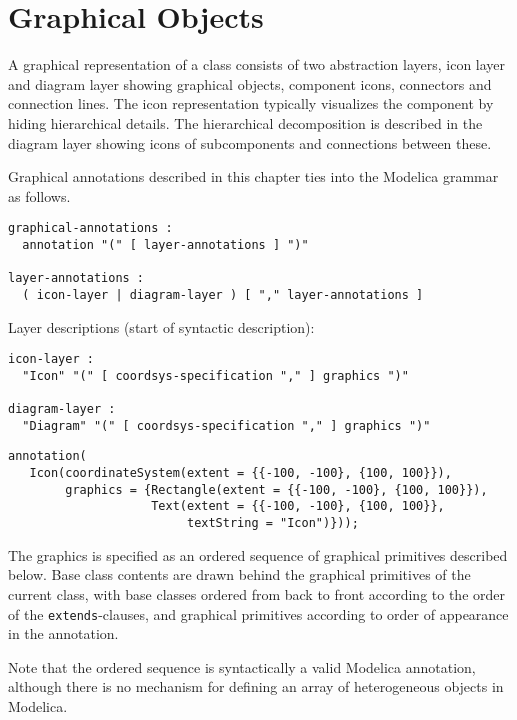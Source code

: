 \section{Graphical Objects}\label{annotations-for-graphical-objects}\label{graphical-objects}

A graphical representation of a class consists of two abstraction layers, icon layer and diagram layer showing graphical objects, component icons, connectors and connection lines.
The icon representation typically visualizes the component by hiding hierarchical details.
The hierarchical decomposition is described in the diagram layer showing icons of subcomponents and connections between these.

Graphical annotations described in this chapter ties into the Modelica grammar as follows.
\begin{lstlisting}[language=grammar]
graphical-annotations :
  annotation "(" [ layer-annotations ] ")"

layer-annotations :
  ( icon-layer | diagram-layer ) [ "," layer-annotations ]
\end{lstlisting}
Layer descriptions (start of syntactic description):
\begin{lstlisting}[language=grammar]
icon-layer :
  "Icon" "(" [ coordsys-specification "," ] graphics ")"

diagram-layer :
  "Diagram" "(" [ coordsys-specification "," ] graphics ")"
\end{lstlisting}%

\begin{example}
\begin{lstlisting}[language=modelica]
annotation(
   Icon(coordinateSystem(extent = {{-100, -100}, {100, 100}}),
        graphics = {Rectangle(extent = {{-100, -100}, {100, 100}}),
                    Text(extent = {{-100, -100}, {100, 100}},
                         textString = "Icon")}));
\end{lstlisting}
\end{example}

The graphics is specified as an ordered sequence of graphical primitives described below.
Base class contents are drawn behind the graphical primitives of the current class, with base classes ordered from back to front according to the order of the \lstinline!extends!-clauses, and graphical primitives according to order of appearance in the annotation.

\begin{nonnormative}
Note that the ordered sequence is syntactically a valid Modelica annotation, although there is no mechanism for defining an array of heterogeneous objects in Modelica.
\end{nonnormative}

